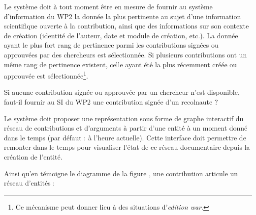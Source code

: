 \exig{}
Le système doit à tout moment être en mesure de fournir au système d'information du WP2 la donnée la plus pertinente au sujet d'une information scientifique ouverte à la contribution, ainsi que des informations sur son contexte de création (identité de l'auteur, date et module de création, etc.).
La donnée ayant le plus fort rang de pertinence parmi les contributions signées ou approuvées par des chercheurs est sélectionnée.
Si plusieurs contributions ont un même rang de pertinence existent, celle ayant été la plus récemment créée ou approuvée est sélectionnée\footnote{Ce mécanisme peut donner lieu à des situations d'{\it edition war}.}.

\idea{}
Si aucune contribution signée ou approuvée par un chercheur n'est disponible, faut-il fournir au SI du WP2 une contribution signée d'un recolnaute ?

\startsubsection[title={IHM}]

\exig{}
Le système doit proposer une représentation sous forme de graphe interactif du réseau de contributions et d'arguments à partir d'une entité à un moment donné dans le temps (par défaut : à l'heure actuelle).
Cette interface doit permettre de remonter dans le temps pour visualiser l'état de ce réseau documentaire depuis la création de l'entité.

\startsection[title={Éléments de modélisation},reference=c:relopn:s:model]

\startsubsection[title={Contribution = Relation + Opinion}]

Ainsi qu'en témoigne le diagramme de la figure , une contribution articule un réseau d'entités :

